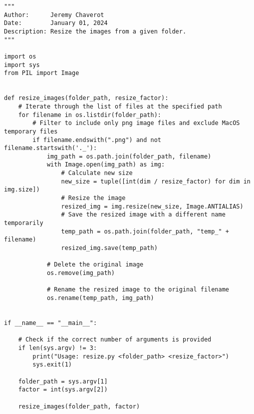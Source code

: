 \begin{lstlisting}[style=pythonstyle, label=lst:5, caption=Python script \texttt{resize.py} designed to alter an image's size with respect to a specified resize factor.]
"""
Author:      Jeremy Chaverot
Date:        January 01, 2024
Description: Resize the images from a given folder.
"""

import os
import sys
from PIL import Image


def resize_images(folder_path, resize_factor):
	# Iterate through the list of files at the specified path
    for filename in os.listdir(folder_path):
    	# Filter to include only png image files and exclude MacOS temporary files
        if filename.endswith(".png") and not filename.startswith('._'):
            img_path = os.path.join(folder_path, filename)
            with Image.open(img_path) as img:
                # Calculate new size
                new_size = tuple([int(dim / resize_factor) for dim in img.size])
                # Resize the image
                resized_img = img.resize(new_size, Image.ANTIALIAS)
                # Save the resized image with a different name temporarily
                temp_path = os.path.join(folder_path, "temp_" + filename)
                resized_img.save(temp_path)

            # Delete the original image
            os.remove(img_path)

            # Rename the resized image to the original filename
            os.rename(temp_path, img_path)


if __name__ == "__main__":

	# Check if the correct number of arguments is provided
    if len(sys.argv) != 3:
        print("Usage: resize.py <folder_path> <resize_factor>")
        sys.exit(1)

    folder_path = sys.argv[1]
    factor = int(sys.argv[2])

    resize_images(folder_path, factor)
\end{lstlisting}




\cleardoublepage{}
